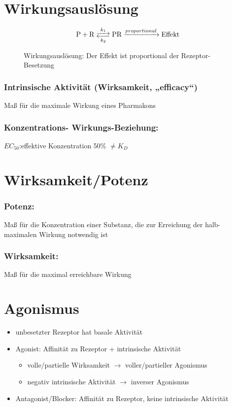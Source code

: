 \documentclass[10pt,a4paper]{report}
\newenvironment{reaction}{\begin{equation}}{\end{equation}}
\begin{document}
\section{Wirkungsauslösung}
\begin{figure}
\begin{reaction}
	\ce{P + R <-->[{k_1}][{k_2}] PR ->[{proportional}] Effekt}
\end{reaction}
\caption{Wirkungsauslösung: Der Effekt ist proportional der Rezeptor-Besetzung}
\end{figure}

\subsubsection{Intrinsische Aktivität 
(Wirksamkeit, „efficacy“)}Maß für die maximale Wirkung 
eines Pharmakons
\subsubsection{Konzentrations-
Wirkungs-Beziehung:}$EC_{50}$:effektive Konzentration 50\% $\neq K_D$
\section{Wirksamkeit/Potenz}
\subsubsection{Potenz:}Maß für die 
Konzentration einer Substanz, 
die zur Erreichung der halb-
maximalen Wirkung 
notwendig ist
\subsubsection{Wirksamkeit:}Maß für 
die maximal erreichbare 
Wirkung
\section{Agonismus}
\begin{itemize}
 \item unbesetzter Rezeptor hat basale Aktivität
	\item Agonist: Affinität zu Rezeptor + intrinsische Aktivität 
		\begin{itemize}
		\item	volle/partielle Wirksamkeit $\rightarrow$ voller/partieller Agonismus
		\item negativ intrinsische Aktivität $\rightarrow$ inverser Agonismus
		\end{itemize}	
	\item Antagonist/Blocker: Affinität zu Rezeptor, keine intrinsische Aktivität	
\end{itemize}
\end{document}
